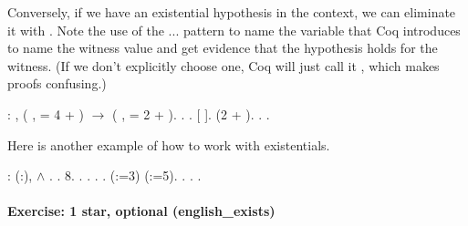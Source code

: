 \documentclass[12pt]{report}
\begin{document}
 Conversely, if we have an existential hypothesis in the
    context, we can eliminate it with .  Note the use
    of the ... pattern to name the variable that Coq
    introduces to name the witness value and get evidence that
    the hypothesis holds for the witness.  (If we don't
    explicitly choose one, Coq will just call it , which
    makes proofs confusing.) \begin{coqdoccode}
\coqdocemptyline
\coqdocnoindent
{}  : \coqdockw{\ensuremath{\forall}} ,\coqdoceol
\coqdocindent{1.00em}
(\coqdoctac{\ensuremath{\exists}} ,  = 4 + ) \ensuremath{\rightarrow}\coqdoceol
\coqdocindent{1.00em}
(\coqdoctac{\ensuremath{\exists}} ,  = 2 + ).\coqdoceol
\coqdocnoindent
{}.\coqdoceol
\coqdocindent{1.00em}
  .\coqdoceol
\coqdocindent{1.00em}
   [ ].\coqdoceol
\coqdocindent{1.00em}
\coqdoctac{\ensuremath{\exists}} (2 + ).\coqdoceol
\coqdocindent{1.00em}
 . .\coqdoceol
\coqdocemptyline
\end{coqdoccode}
Here is another example of how to work with existentials. \begin{coqdoccode}
\coqdocnoindent
{}  : \coqdoceol
\coqdocindent{1.00em}
\coqdoctac{\ensuremath{\exists}} (:),   \ensuremath{\land}  .\coqdoceol
\coqdocnoindent
{}.\coqdoceol
\coqdocindent{1.00em}
\coqdoctac{\ensuremath{\exists}} 8.\coqdoceol
\coqdocindent{1.00em}
.\coqdoceol
\coqdocindent{1.00em}
 . . .\coqdoceol
\coqdocindent{1.00em}
   (:=3) (:=5).\coqdoceol
\coqdocindent{1.00em}
 .  .\coqdoceol
\coqdocnoindent
{}.\coqdoceol
\coqdocemptyline
\end{coqdoccode}
\paragraph{Exercise: 1 star, optional (english\_exists)}
\end{document}
